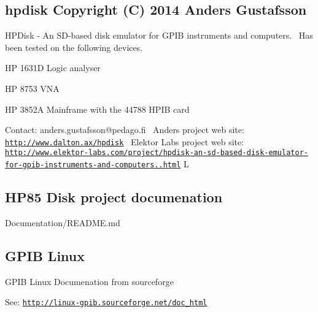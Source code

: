 \subsection*{hpdisk Copyright (C) 2014 Anders Gustafsson}

H\+P\+Disk -\/ An S\+D-\/based disk emulator for G\+P\+IB instruments and computers.~\newline
 Has been tested on the following devices.
\begin{DoxyItemize}
\item HP 1631D Logic analyser
\item HP 8753 V\+NA
\item HP 3852A Mainframe with the 44788 H\+P\+IB card
\end{DoxyItemize}

Contact\+: anders.\+gustafsson@pedago.\+fi~\newline
 Anders project web site\+: \href{http://www.dalton.ax/hpdisk}{\tt http\+://www.\+dalton.\+ax/hpdisk}~\newline
 Elektor Labs project web site\+: \href{http://www.elektor-labs.com/project/hpdisk-an-sd-based-disk-emulator-for-gpib-instruments-and-computers.13693.html}{\tt http\+://www.\+elektor-\/labs.\+com/project/hpdisk-\/an-\/sd-\/based-\/disk-\/emulator-\/for-\/gpib-\/instruments-\/and-\/computers..\+html} L 



\subsection*{H\+P85 Disk project documenation}


\begin{DoxyItemize}
\item Documentation/\+R\+E\+A\+D\+M\+E.\+md
\end{DoxyItemize}





\subsection*{G\+P\+IB Linux}


\begin{DoxyItemize}
\item G\+P\+IB Linux Documenation from sourceforge
\begin{DoxyItemize}
\item See\+: \href{http://linux-gpib.sourceforge.net/doc_html}{\tt http\+://linux-\/gpib.\+sourceforge.\+net/doc\+\_\+html}
\end{DoxyItemize}
\end{DoxyItemize}





